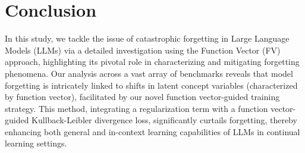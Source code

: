\section{Conclusion}

In this study, we tackle the issue of catastrophic forgetting in Large Language Models (LLMs) via a detailed investigation using the Function Vector (FV) approach, highlighting its pivotal role in characterizing and mitigating forgetting phenomena. Our analysis across a vast array of benchmarks reveals that model forgetting is intricately linked to shifts in latent concept variables (characterized by function vector), facilitated by our novel function vector-guided training strategy. This method, integrating a regularization term with a function vector-guided Kullback-Leibler divergence loss, significantly curtails forgetting, thereby enhancing both general and in-context learning capabilities of LLMs in continual learning settings.





